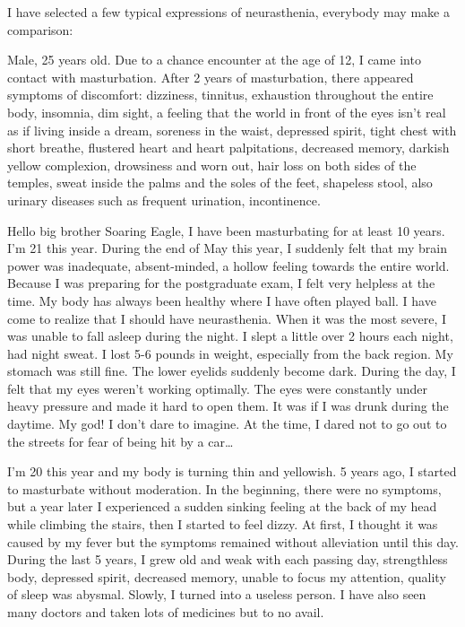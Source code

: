 \documentclass[
]{book}
\begin{document}
I have selected a few typical expressions of neurasthenia, everybody may make a comparison:

Male, 25 years old. Due to a chance encounter at the age of 12, I came into contact with masturbation. After 2 years of masturbation, there appeared symptoms of discomfort: dizziness, tinnitus, exhaustion throughout the entire body, insomnia, dim sight, a feeling that the world in front of the eyes isn't real as if living inside a dream, soreness in the waist, depressed spirit, tight chest with short breathe, flustered heart and heart palpitations, decreased memory, darkish yellow complexion, drowsiness and worn out, hair loss on both sides of the temples, sweat inside the palms and the soles of the feet, shapeless stool, also urinary diseases such as frequent urination, incontinence.

Hello big brother Soaring Eagle, I have been masturbating for at least 10 years. I'm 21 this year. During the end of May this year, I suddenly felt that my brain power was inadequate, absent-minded, a hollow feeling towards the entire world. Because I was preparing for the postgraduate exam, I felt very helpless at the time. My body has always been healthy where I have often played ball. I have come to realize that I should have neurasthenia. When it was the most severe, I was unable to fall asleep during the night. I slept a little over 2 hours each night, had night sweat. I lost 5-6 pounds in weight, especially from the back region. My stomach was still fine. The lower eyelids suddenly become dark. During the day, I felt that my eyes weren't working optimally. The eyes were constantly under heavy pressure and made it hard to open them. It was if I was drunk during the daytime. My god! I don't dare to imagine. At the time, I dared not to go out to the streets for fear of being hit by a car\ldots{}

I'm 20 this year and my body is turning thin and yellowish. 5 years ago, I started to masturbate without moderation. In the beginning, there were no symptoms, but a year later I experienced a sudden sinking feeling at the back of my head while climbing the stairs, then I started to feel dizzy. At first, I thought it was caused by my fever but the symptoms remained without alleviation until this day. During the last 5 years, I grew old and weak with each passing day, strengthless body, depressed spirit, decreased memory, unable to focus my attention, quality of sleep was abysmal. Slowly, I turned into a useless person. I have also seen many doctors and taken lots of medicines but to no avail.
\end{document}
